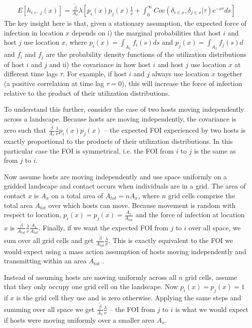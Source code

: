 \documentclass[letterpaper]{article}
\begin{document}
\begin{equation}
    \begin{aligned}
    E[h_{i \leftarrow j}(x)] = \frac{\tilde{\beta}}{A_x} \lambda [p_i(x)p_j(x) \frac{1}{\nu} + \int_{0}^{\infty} Cov(\delta_{i \in x}, \delta_{j \in x} | \tau) e^{-\nu \tau} ds]
    \end{aligned}
    \label{eq:foi_stationary}
\end{equation}
The key insight here is that, given a stationary assumption, the expected force of infection in location $x$ depends on i) the marginal probabilities that host $i$ and host $j$ use location $x$, where $p_i(x) = \int_{A_x} f_i(s) ds$ and $p_j(x) = \int_{A_x} f_j(s) d$ and $f_i$ and $f_j$ are the probability density functions of the utilization distributions of host $i$ and $j$ and ii) the covariance in how host $i$ and host $j$ use location $x$ at different time lags $\tau$. For example, if host $i$ and $j$ always use location $x$ together (a positive correlation at time lag $\tau = 0$), this will increase the force of infection relative to the product of their utilization distributions.

To understand this further, consider the case of two hosts moving independently across a landscape.  Because hosts are moving independently, the covariance is zero such that $\frac{\tilde{\beta}}{A_x} \frac{\lambda}{\nu} p_i(x)p_j(x)$ -- the expected FOI experienced by two hosts is exactly proportional to the products of their utilization distributions.  In this particular case the FOI is symmetrical, i.e. the FOI from $i$ to $j$ is the same as from $j$ to $i$.

Now assume hosts are moving independently and use space uniformly on a gridded landscape and contact occurs when individuals are in a grid.  The area of contact $x$ is $A_x$ on a total area of $A_{tot} = n A_x$, where $n$ grid cells comprise the total area $A_{tot}$ over which hosts can move. Because movement is random with respect to location, $p_i(x) = p_j(x) = \frac{A_x}{A_{tot}}$ and the force of infection at location $x$ is $\frac{\tilde{\beta}}{A_{tot}} \frac{\lambda}{\nu} \frac{A_x}{A_{tot}}$.  Finally, if we want the expected FOI from $j$ to $i$ over all space, we sum over all grid cells and get $\frac{\tilde{\beta}}{A_{tot}} \frac{\lambda}{\nu}$. This is exactly equivalent to the FOI we would expect using a mass action assumption of hosts moving independently and transmitting within an area $A_{tot}$ \citep{McCallum2001}.

Instead of assuming hosts are moving uniformly across all $n$ grid cells, assume that they only occupy one grid cell on the landscape.  Now $p_i(x) = p_j(x) = 1$ if $x$ is the grid cell they use and is zero otherwise.  Applying the same steps and summing over all space we get $\frac{\tilde{\beta}}{A_{x}} \frac{\lambda}{\nu}$ -- the FOI from $j$ to $i$ is what we would expect if hosts were moving uniformly over a smaller area $A_x$. 
\end{document}
